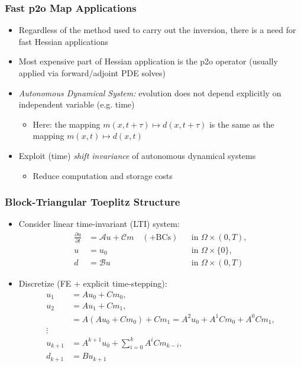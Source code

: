 \begin{frame}
    \frametitle{Fast p2o Map Applications}
    \begin{itemize}
        \item Regardless of the method used to carry out the inversion, there is a need for fast Hessian applications
        \item Most expensive part of Hessian application is the p2o operator (usually applied via forward/adjoint PDE solves)
        \item \emph{Autonomous Dynamical System:} evolution does not depend explicitly on independent variable (e.g. time)
        \begin{itemize}
            \item Here: the mapping \(m(x,t+\tau) \mapsto d(x,t+\tau)\) is the same as the mapping \(m(x,t) \mapsto d(x,t)\)
        \end{itemize}
        \item Exploit (time) \emph{shift invariance} of autonomous dynamical systems
        \begin{itemize}
            \item Reduce computation and storage costs
        \end{itemize}
    \end{itemize}
\end{frame}

\begin{frame}
    \frametitle{Block-Triangular Toeplitz Structure}
    \begin{itemize}
        \item Consider linear time-invariant (LTI) system:
        \[
        \begin{aligned}
        \frac{\partial u}{\partial t} &= \mathcal{A} u + \mathcal{C} m \quad (+\text{BCs}) && \text{in } \Omega \times (0,T), \\
        u &= u_0 && \text{in } \Omega \times \{ 0 \}, \\
        d &= \mathcal{B} u && \text{in } \Omega \times (0,T)
        \end{aligned}
        \]
        \item Discretize (FE + explicit time-stepping):
        \[
        \begin{aligned}
        u_1 &= A u_0 + C m_0 , \\
        u_2 &= A u_1 + C m_1 , \\
        &= A (A u_0 + C m_0) + C m_1 = A^2 u_0 + A^1 C m_0 + A^0 C m_1 , \\
        \vdots \\
        u_{k+1} &= A^{k+1} u_0 + \sum_{i=0}^k A^i C m_{k-i} , \\
        d_{k+1} &= B u_{k+1}
        \end{aligned}
        \]
    \end{itemize}
\end{frame}

